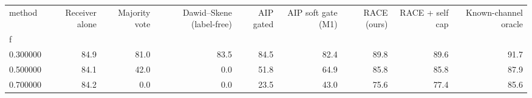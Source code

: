 \begin{tabular}{lrrrrrrrr}
\toprule
method & Receiver alone & Majority vote & Dawid–Skene (label-free) & AIP gated & AIP soft gate (M1) & RACE (ours) & RACE + self cap & Known-channel oracle \\
f &  &  &  &  &  &  &  &  \\
\midrule
0.300000 & 84.9 & 81.0 & 83.5 & 84.5 & 82.4 & 89.8 & 89.6 & 91.7 \\
0.500000 & 84.1 & 42.0 & 0.0 & 51.8 & 64.9 & 85.8 & 85.8 & 87.9 \\
0.700000 & 84.2 & 0.0 & 0.0 & 23.5 & 43.0 & 75.6 & 77.4 & 85.6 \\
\bottomrule
\end{tabular}
